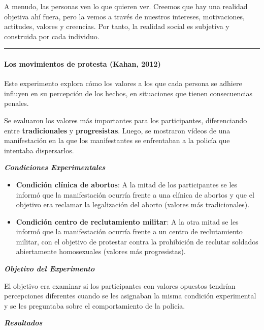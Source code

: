 \documentclass[
]{website}
\providecommand{\tightlist}{%
  \setlength{\itemsep}{0pt}\setlength{\parskip}{0pt}}
\begin{document}
A menudo, las personas ven lo que quieren ver. Creemos que hay una realidad objetiva ahí fuera, pero la vemos a través de nuestros intereses, motivaciones, actitudes, valores y creencias. Por tanto, la realidad social es subjetiva y construida por cada individuo.

\begin{center}\rule{0.5\linewidth}{0.5pt}\end{center}

\paragraph*{Los movimientos de protesta (Kahan, 2012)}\label{los-movimientos-de-protesta-kahan-2012}

Este experimento explora cómo los valores a los que cada persona se adhiere influyen en su percepción de los hechos, en situaciones que tienen consecuencias penales.

Se evaluaron los valores más importantes para los participantes, diferenciando entre \textbf{tradicionales} y \textbf{progresistas}. Luego, se mostraron vídeos de una manifestación en la que los manifestantes se enfrentaban a la policía que intentaba dispersarlos.

\textbf{\emph{Condiciones Experimentales}}

\begin{itemize}
\tightlist
\item
  \textbf{Condición clínica de abortos}: A la mitad de los participantes se les informó que la manifestación ocurría frente a una clínica de abortos y que el objetivo era reclamar la legalización del aborto (valores más tradicionales).
\item
  \textbf{Condición centro de reclutamiento militar}: A la otra mitad se les informó que la manifestación ocurría frente a un centro de reclutamiento militar, con el objetivo de protestar contra la prohibición de reclutar soldados abiertamente homosexuales (valores más progresistas).
\end{itemize}

\textbf{\emph{Objetivo del Experimento}}

El objetivo era examinar si los participantes con valores opuestos tendrían percepciones diferentes cuando se les asignaban la misma condición experimental y se les preguntaba sobre el comportamiento de la policía.

\textbf{\emph{Resultados}}
\end{document}
